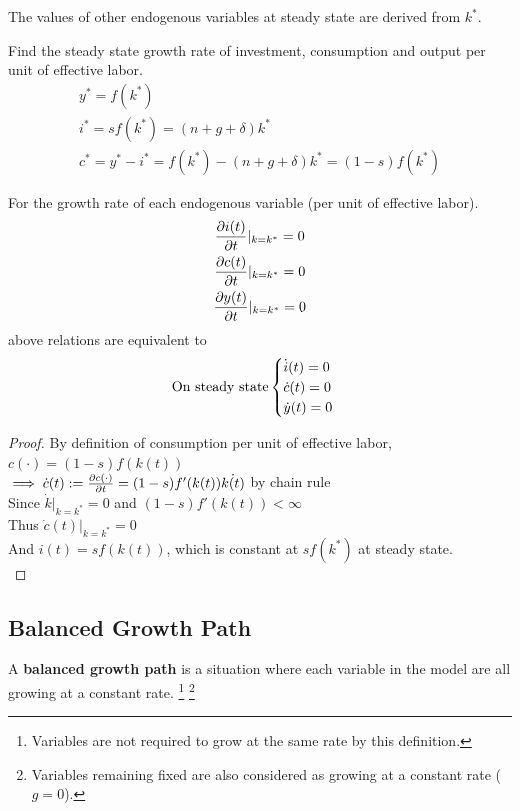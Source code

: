 \documentclass[11pt]{article}
\begin{document}
			\begin{remark}
				The values of other endogenous variables at steady state are derived from $k^*$.
				\begin{example} Find the steady state growth rate of investment, consumption and output per unit of effective labor.
					\begin{gather}
						y^* = f(k^*) \\
						i^* = sf(k^*) = (n+g+\delta) k^* \\
						c^* = y^* - i^* = f(k^*) - (n+g+\delta)k^* = (1-s)f(k^*)
					\end{gather}
				\end{example}
				For the growth rate of each endogenous variable (per unit of effective labor). 
					\begin{gather}
						\frac{\partial{i(t)}}{\partial{t}}|_{k=k^*} = 0 \\
						\frac{\partial{c(t)}}{\partial{t}}|_{k=k^*} = 0 \\
						\frac{\partial{y(t)}}{\partial{t}}|_{k=k^*} = 0 
					\end{gather}
					above relations are equivalent to 
					\begin{gather}
						\text{{On steady state}} \begin{cases}
							\dot{i}(t) = 0 \\
							\dot{c}(t) = 0 \\
							\dot{y}(t) = 0 \\
						\end{cases}
					\end{gather}
			\end{remark}
			
			\begin{proof}
				By definition of consumption per unit of effective labor,\\
				$c(\cdot) = (1-s)f(k(t))$ \\
				$\implies \dot{c}(t) := \frac{\partial{c(\cdot)}}{\partial{t}} = (1-s)f'(k(t)) \dot{k(t)}$ by chain rule \\
				Since $\dot{k}|_{k=k^*} = 0$ and $(1-s)f'(k(t)) < \infty$ \\
				Thus $\dot{c}(t)|_{k=k^*} = 0$ \\
				And $i(t) = sf(k(t))$, which is constant at $sf(k^*)$ at steady state. \\
			\end{proof}
			
		\subsection{Balanced Growth Path}
			\begin{definition}
				A \textbf{balanced growth path} is a situation where each variable in the model are all growing at a constant rate. \footnote{Variables are not required to grow at the same rate by this definition.} \footnote{Variables remaining fixed are also considered as growing at a constant rate ($g=0$).}
			\end{definition}
			
\end{document}
